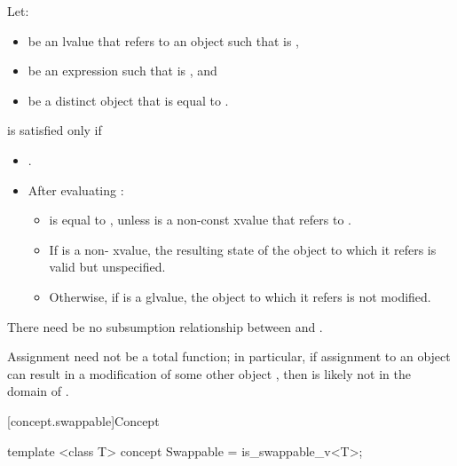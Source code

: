 \begin{itemdescr}
\pnum
Let:
\begin{itemize}
\item {} be an lvalue that refers to an object  such that
   is ,
\item {} be an expression such that  is
  , and
\item {} be a distinct object that is equal to .
\end{itemize}
 is satisfied only if

\begin{itemize}
\item {}.

\item After evaluating :

\begin{itemize}
\item {} is equal to , unless  is a non-const
xvalue that refers to .

\item If  is a non- xvalue, the resulting state of the
object to which it refers is valid but unspecified.

\item Otherwise, if  is a glvalue, the object to which it refers is
  not modified.
\end{itemize}
\end{itemize}

\pnum
There need be no subsumption relationship between
and
.

\pnum
\begin{note}
Assignment need not be a total function;
in particular, if assignment to an object  can result in a modification
of some other object , then  is likely not in the domain
of \tcode{=}.
\end{note}
\end{itemdescr}

[concept.swappable]{Concept }

%
\begin{itemdecl}
template <class T>
concept Swappable = is_swappable_v<T>;
\end{itemdecl}

